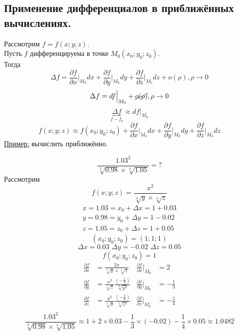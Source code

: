 \documentclass[12pt]{article}
\begin{document}
    \subsection{Применение дифференциалов в приближённых вычислениях.}\noindent
    Рассмотрим $f = f(x; y; z)$.\\
    Пусть $f$ дифференцируема в точке $M_0 (x_0; y_0; z_0)$.\\
    Тогда 
    \[ \Delta f = \frac{\partial f}{\partial x} \Big|_{M_0}dx + \frac{\partial f}{\partial y} \Big|_{M_0}dy + \frac{\partial f}{\partial z} \Big|_{M_0}dz + o(\rho), \rho \to 0\]
    \[ \Delta f = df \Big|_{M_0} + \cancel{o(\rho)}, \rho \to 0 \]
    \[ \underbrace{\Delta f}_{f - f_0} \approx df \Big|_{M_0} \]
    \[ \boxed{ f(x; y; z) \approx f(x_0; y_0; z_0) + \frac{\partial f}{\partial x} \Big|_{M_0}dx + \frac{\partial f}{\partial y} \Big|_{M_0}dy + \frac{\partial f}{\partial z} \Big|_{M_0}dz  } \]
    \underline{Пример:} вычислить приближённо.
    \begin{adjustwidth}{1.5em}{1.5em}
        \[ \frac{1.03^2}{\sqrt[3]{0.98} \times \sqrt[4]{1.05}} = ? \]
        Рассмотрим 
        \[ f(x; y; z) = \frac{x^2}{\sqrt[3]{y} \times \sqrt[4]{z}} \]
        \begin{gather*}
            x = 1.03 = x_0 + \Delta x = 1 + 0.03\\
            y = 0.98 = y_0 + \Delta y = 1 - 0.02\\
            z = 1.05 = z_0 + \Delta z = 1 + 0.05
        \end{gather*}
        \[ (x_0; y_0; z_0) = (1; 1; 1) \]
        \[ \Delta x = 0.03\,\, \Delta y = -0.02\,\, \Delta z = 0.05 \]
        \[ f(x_0; y_0; z_0) = 1 \]
        \begin{align*}
            \frac{\partial f}{\partial x} &= \frac{2x}{\sqrt[3]{y} \times \sqrt[4]{z}} & \frac{\partial f}{\partial x} \Big|_{M_0} &= 2\\
            \frac{\partial f}{\partial y} &= \frac{x^2}{\sqrt[4]{z}}\frac{(-\frac{1}{3})}{\sqrt[3]{y^4}} & \frac{\partial f}{\partial y} \Big|_{M_0} &= -\frac{1}{3}\\
            \frac{\partial f}{\partial z} &= \frac{x^2}{\sqrt[3]{y}}\frac{(-\frac{1}{4})}{\sqrt[4]{z^5}} & \frac{\partial f}{\partial z} \Big|_{M_0} &= -\frac{1}{4}\\
        \end{align*}
        \[ \frac{1.03^2}{\sqrt[3]{0.98} \times \sqrt[4]{1.05}} \approx 1 + 2 \times 0.03 - \frac{1}{3} \times (-0.02) - \frac{1}{4} \times 0.05 \approx 1.0482 \]
    \end{adjustwidth}
\end{document}

